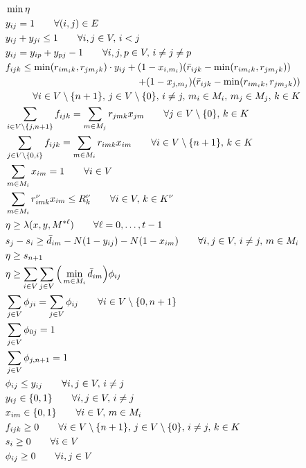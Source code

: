\documentclass[a4paper,abstracton]{scrartcl}
\begin{document}
\begin{align}
	& \min \eta\label{eqn:master_first}\\
	& y_{ij} = 1 \qquad \forall (i,j)\in E \label{eqn:master_y1}\\
	& y_{ij} + y_{ji} \leq 1 \qquad \forall i,j\in V,\, i<j\label{eqn:master_y2}\\
	& y_{ij} = y_{ip} + y_{p j} - 1 \qquad \forall i,j,p\in V,\,i\neq j\neq p\label{eqn:master_y3}\\
	& f_{ijk} \leq \min(r_{im_ik}, r_{jm_jk})\cdot y_{ij} + (1 - x_{i,m_i})(\bar{r}_{ijk} - \min(r_{im_ik}, r_{jm_jk}))\nonumber\\
	& & \hspace{-8cm} + (1 - x_{j,m_j})(\bar{r}_{ijk} - \min(r_{im_ik}, r_{jm_jk})) \nonumber \\
	& & \hspace{-10cm}\forall i\in V\setminus\{n+1\},\, j \in V\setminus\{0\},\, i\neq j,\,m_i\in M_i,\,m_j\in M_j,\,k\in K\label{eqn:master_f1}\\
	& \sum_{i\in V\setminus\{j,n+1\}}f_{ijk} = \sum_{m\in M_j}r_{jmk}x_{jm} \qquad \forall j \in V\setminus\{0\} ,\,k\in K\label{eqn:master_f2}\\
	& \sum_{j\in V\setminus\{0,i\}}f_{ijk} = \sum_{m\in M_i}r_{imk}x_{im} \qquad \forall i \in V\setminus\{n+1\} ,\,k\in K\label{eqn:master_f3}\\
	& \sum_{m\in M_i}x_{im} = 1\qquad \forall i \in V\label{eqn:master_x}\\
	& \sum_{m\in M_i}r^{\nu}_{imk}x_{im} \leq R^{\nu}_k \qquad \forall i\in V,\,k\in K^{\nu}\label{eqn:master_nonrenewable}\\
	& \eta \geq \lambda(x, y, M^{*\ell}) \qquad \forall \ell=0,\dots,t-1\label{eqn:master_cuts}\\
	& s_j - s_i \geq \bar{d}_{im} - N(1-y_{ij}) - N(1-x_{im}) \qquad \forall i,j\in V,\, i\neq j,\,m\in M_i\label{eqn:master_relaxation1_1}\\
	& \eta \geq s_{n+1}\label{eqn:master_relaxation1_2}\\
	& \eta \geq \sum_{i \in V}\sum_{j\in V}\Big(\min_{m\in M_i}\bar{d}_{im}\Big)\phi_{ij}\label{eqn:master_relaxation2_1}\\
	& \sum_{j\in V}\phi_{ji} = \sum_{j\in V}\phi_{ij} \qquad \forall i \in V\setminus\{0,n+1\}\\
	& \sum_{j\in V}\phi_{0j} = 1\\
	& \sum_{j\in V}\phi_{j,n+1} = 1\\
	& \phi_{ij} \leq y_{ij} \qquad \forall i,j\in V,\,i\neq j\label{eqn:master_relaxation2_5}\\
	& y_{ij} \in\{0,1\} \qquad \forall i,j\in V,\,i\neq j\\
	& x_{im} \in \{0,1\} \qquad \forall i \in V,\, m\in M_i\\
	& f_{ijk} \geq 0 \qquad \forall i\in V\setminus\{n+1\},\,j\in V\setminus\{0\},\,i\neq j,\,k\in K\\
	& s_i \geq 0 \qquad \forall i\in V\\
	& \phi_{ij} \geq 0 \qquad \forall i,j\in V \label{eqn:master_last}
\end{align}
\end{document}
